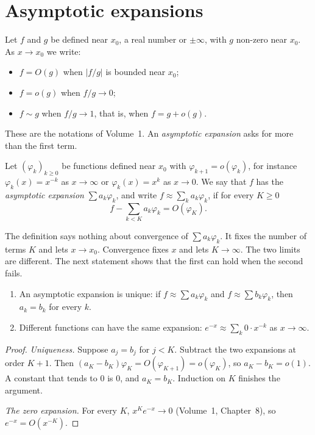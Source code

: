 \section{Asymptotic expansions}

Let $f$ and $g$ be defined near $x_0$, a real number or $\pm\infty$, with $g$ non-zero near $x_0$. As $x\to x_0$ we write:
\begin{itemize}
\item $f=O(g)$ when $|f/g|$ is bounded near $x_0$;
\item $f=o(g)$ when $f/g\to0$;
\item $f\sim g$ when $f/g\to1$, that is, when $f=g+o(g)$.
\end{itemize}
These are the notations of Volume~1. An \emph{asymptotic expansion} asks for more than the first term.

\begin{definition}
Let $(\varphi_k)_{k\ge0}$ be functions defined near $x_0$ with $\varphi_{k+1}=o(\varphi_k)$, for instance $\varphi_k(x)=x^{-k}$ as $x\to\infty$ or $\varphi_k(x)=x^k$ as
$x\to0$. We say that $f$ has the \emph{asymptotic expansion} $\sum a_k\varphi_k$, and write $f\approx\sum_ka_k\varphi_k$, if for every $K\ge0$
\[
f-\sum_{k<K}a_k\varphi_k=O(\varphi_K).
\]
\end{definition}

The definition says nothing about convergence of $\sum a_k\varphi_k$. It fixes the number of terms $K$ and lets $x\to x_0$. Convergence fixes $x$ and lets $K\to\infty$. The two limits are different. The next statement shows that the first can hold when the second fails.

\begin{proposition}\label{prop:asymunique}
\begin{enumerate}[label=(\alph*)]
\item An asymptotic expansion is unique: if $f\approx\sum a_k\varphi_k$ and $f\approx\sum b_k\varphi_k$, then $a_k=b_k$ for every $k$.
\item Different functions can have the same expansion: $e^{-x}\approx\sum_k0\cdot x^{-k}$ as $x\to\infty$.
\end{enumerate}
\end{proposition}
\begin{proof}
\emph{Uniqueness.} Suppose $a_j=b_j$ for $j<K$. Subtract the two expansions at order $K+1$. Then $(a_K-b_K)\varphi_K=O(\varphi_{K+1})=o(\varphi_K)$, so $a_K-b_K=o(1)$. A constant that tends to $0$ is $0$, and $a_K=b_K$. Induction on $K$ finishes the argument.

\emph{The zero expansion.} For every $K$, $x^Ke^{-x}\to0$ (Volume~1, Chapter~8), so $e^{-x}=O(x^{-K})$.
\end{proof}

